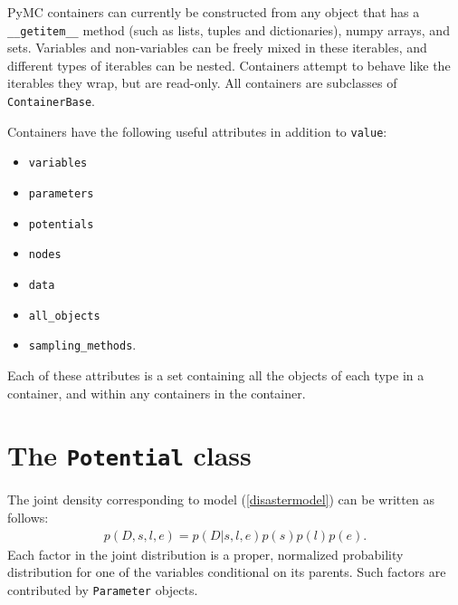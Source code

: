 PyMC containers can currently be constructed from any object that has a \texttt{\_\_getitem\_\_} method (such as lists, tuples and dictionaries), numpy arrays, and sets. Variables and non-variables can be freely mixed in these iterables, and different types of iterables can be nested. Containers attempt to behave like the iterables they wrap, but are read-only. All containers are subclasses of \texttt{ContainerBase}.

Containers have the following useful attributes in addition to \texttt{value}:
\begin{itemize}
    \item\texttt{variables}
    \item\texttt{parameters}
    \item\texttt{potentials}
    \item\texttt{nodes}
    \item\texttt{data}
    \item\texttt{all_objects}
    \item\texttt{sampling_methods}.
\end{itemize}
Each of these attributes is a set containing all the objects of each type in a container, and within any containers in the container.

\section{The \texttt{Potential} class}


The joint density corresponding to model (\ref{disastermodel}) can be written as follows:
\begin{eqnarray*}
    p(D,s,l,e) = p(D|s,l,e) p(s) p(l) p(e).
\end{eqnarray*}
Each factor in the joint distribution is a proper, normalized probability distribution for one of the variables conditional on its parents. Such factors are contributed by \texttt{Parameter} objects.

